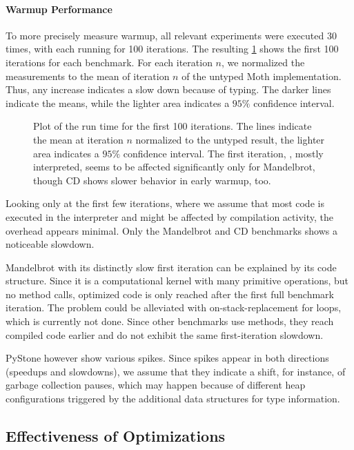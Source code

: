 \paragraph*{Warmup Performance}

To more precisely measure warmup, all relevant experiments were executed 30 times,
with each running for 100 iterations.
The resulting \cref{fig:typing-warmup} shows the first 100 iterations for each benchmark.
For each iteration $n$, we normalized the measurements to the mean of iteration $n$
of the untyped Moth implementation.
Thus, any increase indicates a slow down because of typing.
The darker lines indicate the means, while the lighter area indicates
a $95\%$ confidence interval.

\begin{figure}[htb]
  \centering
  \TypingWarmupConfInterval{}
	\caption{Plot of the run time for the first 100 iterations.
           The lines indicate the mean at iteration $n$ normalized
           to the untyped result, the lighter area indicates a $95\%$ confidence interval.
           The first iteration, \ie, mostly interpreted, seems
           to be affected significantly only for Mandelbrot, though
           CD shows slower behavior in early warmup, too.}
	\label{fig:typing-warmup}
\end{figure}

Looking only at the first few iterations,
where we assume that most code is executed in the interpreter and might be
affected by compilation activity,
the overhead appears minimal.
Only the Mandelbrot and CD benchmarks shows a noticeable slowdown.

Mandelbrot with its distinctly slow first iteration
can be explained by its code structure.
Since it is a computational kernel with many primitive operations,
but no method calls, optimized code is only reached after the first full
benchmark iteration.
The problem could be alleviated with on-stack-replacement
for loops, which is currently not done.
Since other benchmarks use methods, they reach compiled code earlier
and do not exhibit the same first-iteration slowdown.

PyStone however show various spikes.
Since spikes appear in both directions (speedups and slowdowns),
we assume that they indicate a shift,
for instance, of garbage collection pauses,
which may happen because of different heap configurations
triggered by the additional data structures for type information.

\subsection{Effectiveness of Optimizations}

